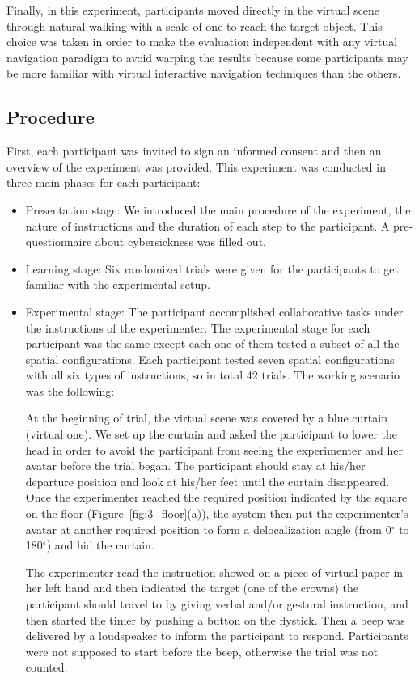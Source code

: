 Finally, in this experiment, participants moved directly in the virtual scene through natural walking with a scale of one to reach the target object. This choice was taken in order to make the evaluation independent with any virtual navigation paradigm to avoid warping the results because some participants may be more familiar with virtual interactive navigation techniques than the others.


\subsection{Procedure}
First, each participant was invited to sign an informed consent and then an overview of the experiment was provided. This experiment was conducted in three main phases for each participant:

\begin{itemize}
\item Presentation stage: We introduced the main procedure of the experiment, the nature of instructions and the duration of each step to the participant. A pre-questionnaire about cybersickness was filled out.
\item Learning stage: Six randomized trials were given for the participants to get familiar with the experimental setup.
\item Experimental stage: The participant accomplished collaborative tasks under the instructions of the experimenter. The experimental stage for each participant was the same except each one of them tested a subset of all the spatial configurations. Each participant tested seven spatial configurations with all six types of instructions, so in total 42 trials. The working scenario was the following:

At the beginning of trial, the virtual scene was covered by a blue curtain (virtual one). We set up the curtain and asked the participant to lower the head in order to avoid the participant from seeing the experimenter and her avatar before the trial began. The participant should stay at his/her departure position and look at his/her feet until the curtain disappeared. Once the experimenter reached the required position indicated by the square on the floor (Figure~\ref{fig:3_floor}(a)), the system then put the experimenter's avatar at another required position to form a delocalization angle (from 0$^\circ$ to 180$^\circ$) and hid the curtain.

The experimenter read the instruction showed on a piece of virtual paper in her left hand and then indicated the target (one of the crowns) the participant should travel to by giving verbal and/or gestural instruction, and then started the timer by pushing a button on the flystick. Then a beep was delivered by a loudspeaker to inform the participant to respond. Participants were not supposed to start before the beep, otherwise the trial was not counted.


\end{itemize}
